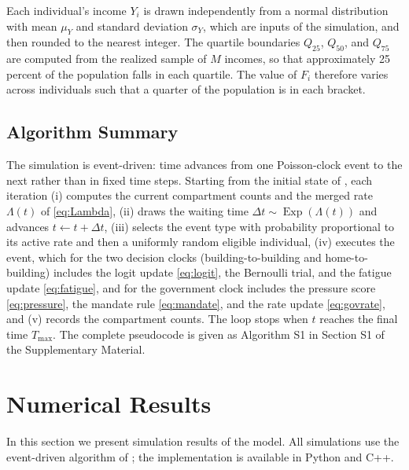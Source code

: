\documentclass[11pt]{article}
\theoremstyle{definition}
\theoremstyle{plain}
\begin{document}
Each individual's income $Y_i$ is drawn independently from a normal distribution with mean $\mu_Y$ and standard deviation $\sigma_Y$, which are inputs of the simulation, and then rounded to the nearest integer. The quartile boundaries $Q_{25}$, $Q_{50}$, and $Q_{75}$ are computed from the realized sample of $M$ incomes, so that approximately 25 percent of the population falls in each quartile. The value of $F_i$ therefore varies across individuals such that a quarter of the population is in each bracket.

\subsection{Algorithm Summary}
\label{sec:algorithm}

The simulation is event-driven: time advances from one Poisson-clock event to the next rather than in fixed time steps. Starting from the initial state of , each iteration (i) computes the current compartment counts and the merged rate $\Lambda(t)$ of \eqref{eq:Lambda}, (ii) draws the waiting time $\Delta t\sim\operatorname{Exp}(\Lambda(t))$ and advances $t\leftarrow t+\Delta t$, (iii) selects the event type with probability proportional to its active rate and then a uniformly random eligible individual, (iv) executes the event, which for the two decision clocks (building-to-building and home-to-building) includes the logit update \eqref{eq:logit}, the Bernoulli trial, and the fatigue update \eqref{eq:fatigue}, and for the government clock includes the pressure score \eqref{eq:pressure}, the mandate rule \eqref{eq:mandate}, and the rate update \eqref{eq:govrate}, and (v) records the compartment counts. The loop stops when $t$ reaches the final time $T_{\max}$. The complete pseudocode is given as Algorithm S1 in Section S1 of the Supplementary Material.


\section{Numerical Results}
\label{sec:numerics}


In this section we present simulation results of the model. All simulations use the event-driven algorithm of ; the implementation is available in Python and C++.
\end{document}

